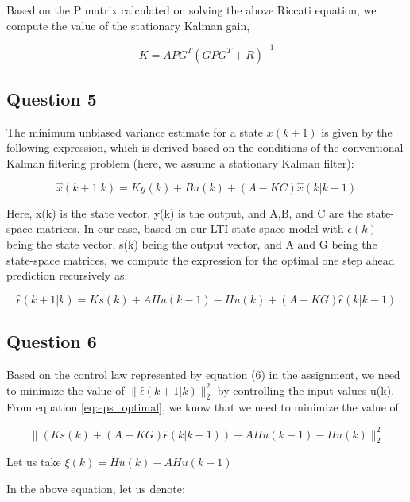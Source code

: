 \documentclass[12pt]{report}
\begin{document}
Based on the P matrix calculated on solving the above Riccati equation, we compute the value of the stationary Kalman gain,

\begin{equation*}
	K = APG^{T}(GPG^{T} + R)^{-1}
\end{equation*}

\subsection*{Question 5}

The minimum unbiased variance estimate for a state $x(k+1)$ is given by the following expression, which is derived based on the conditions of the conventional Kalman filtering problem (here, we assume a stationary Kalman filter):

\begin{equation*}
\hat{x}(k+1|k) = Ky(k) + Bu(k) + (A - KC)\hat{x}(k|k-1)
\end{equation*}

Here, x(k) is the state vector, y(k) is the output, and A,B, and C are the state-space matrices. In our case, based on our LTI state-space model with $\epsilon(k)$ being the state vector, s(k) being the output vector, and A and G being the state-space matrices, we compute the expression for the optimal one step ahead prediction recursively as:

\begin{equation}\label{eq:eps_optimal}
	\hat\epsilon(k+1|k) = Ks(k) + AHu(k-1) - Hu(k) + (A - KG)\hat\epsilon(k|k-1)
\end{equation}

\subsection*{Question 6}

Based on the control law represented by equation (6) in the assignment, we need to minimize the value of $\|\hat\epsilon(k+1|k)\|_{2}^{2}$ by controlling the input values u(k). From equation \ref{eq:eps_optimal}, we know that we need to minimize the value of:

\begin{equation}
\|(Ks(k) + (A - KG)\hat\epsilon(k|k-1)) + AHu(k-1) - Hu(k) \|_{2}^{2}
\end{equation}

Let us take $\xi(k) = Hu(k) - AHu(k-1)$

In the above equation, let us denote:
\end{document}
